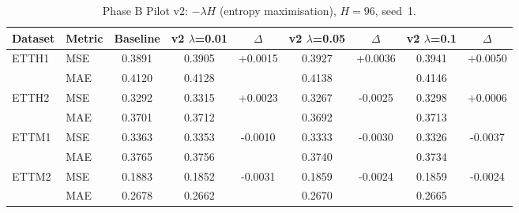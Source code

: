 
\begin{table}[t]
\centering\small
\caption{Phase B Pilot v2: $-\lambda H$ (entropy maximisation), $H=96$, seed~1.}
\label{tab:phase_b_v2}
\begin{tabular}{l l c  c c c c c c}
\toprule
Dataset & Metric & Baseline & v2 $\lambda$=0.01 & $\Delta$ & v2 $\lambda$=0.05 & $\Delta$ & v2 $\lambda$=0.1 & $\Delta$ \\
\midrule
ETTH1 & MSE & 0.3891 & 0.3905 & +0.0015 & 0.3927 & +0.0036 & 0.3941 & +0.0050 \\
 & MAE & 0.4120 & 0.4128 &  & 0.4138 &  & 0.4146 &  \\
ETTH2 & MSE & 0.3292 & 0.3315 & +0.0023 & 0.3267 & -0.0025 & 0.3298 & +0.0006 \\
 & MAE & 0.3701 & 0.3712 &  & 0.3692 &  & 0.3713 &  \\
ETTM1 & MSE & 0.3363 & 0.3353 & -0.0010 & 0.3333 & -0.0030 & 0.3326 & -0.0037 \\
 & MAE & 0.3765 & 0.3756 &  & 0.3740 &  & 0.3734 &  \\
ETTM2 & MSE & 0.1883 & 0.1852 & -0.0031 & 0.1859 & -0.0024 & 0.1859 & -0.0024 \\
 & MAE & 0.2678 & 0.2662 &  & 0.2670 &  & 0.2665 &  \\
\bottomrule
\end{tabular}
\end{table}
